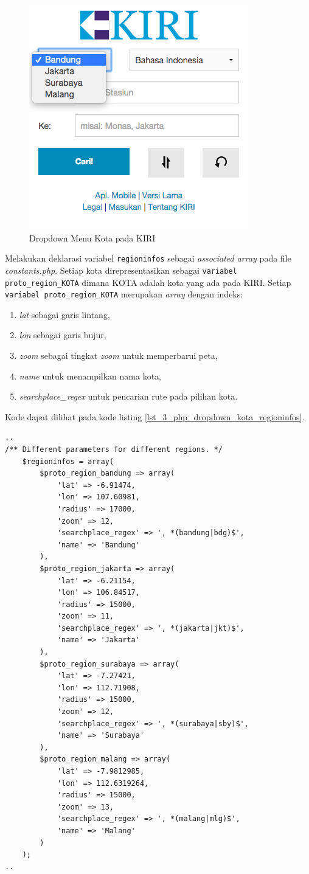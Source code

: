 \begin{figure}[H]
	\centering
	\includegraphics[scale=0.5]{Gambar/KIRI-drop-kota}
	\caption{Dropdown Menu Kota pada KIRI} 
	\label{fig:3_KIRI_drop_kota}
\end{figure}

Melakukan deklarasi variabel \verb!regioninfos! sebagai \textit{associated array} pada file \textit{constants.php}. Setiap kota direpresentasikan sebagai \verb!variabel proto_region_KOTA! dimana KOTA adalah kota yang ada pada KIRI. Setiap \verb!variabel proto_region_KOTA! merupakan \textit{array} dengan indeks:
\begin{enumerate}
	\item \textit{lat} sebagai garis lintang,
	\item \textit{lon} sebagai garis bujur,
	\item \textit{zoom} sebagai tingkat \textit{zoom} untuk memperbarui peta,
	\item \textit{name} untuk menampilkan nama kota,
	\item \textit{searchplace\_regex} untuk pencarian rute pada pilihan kota.
\end{enumerate} 
Kode dapat dilihat pada kode listing \ref{lst_3_php_dropdown_kota_regioninfos}.

\begin{lstlisting}[caption=Deklarasi variabel regioninfos,label = {lst_3_php_dropdown_kota_regioninfos}]
..
/** Different parameters for different regions. */
	$regioninfos = array(
		$proto_region_bandung => array(
			'lat' => -6.91474,
			'lon' => 107.60981,
			'radius' => 17000,
			'zoom' => 12,
			'searchplace_regex' => ', *(bandung|bdg)$',
			'name' => 'Bandung'
		),
		$proto_region_jakarta => array(
			'lat' => -6.21154,
			'lon' => 106.84517,
			'radius' => 15000,
			'zoom' => 11,
			'searchplace_regex' => ', *(jakarta|jkt)$',
			'name' => 'Jakarta'
		),
		$proto_region_surabaya => array(
			'lat' => -7.27421,
			'lon' => 112.71908,
			'radius' => 15000,
			'zoom' => 12,
			'searchplace_regex' => ', *(surabaya|sby)$',
			'name' => 'Surabaya'
		),
		$proto_region_malang => array(
			'lat' => -7.9812985,
			'lon' => 112.6319264,
			'radius' => 15000,
			'zoom' => 13,
			'searchplace_regex' => ', *(malang|mlg)$',
			'name' => 'Malang'				
		)
	);
..
\end{lstlisting}

